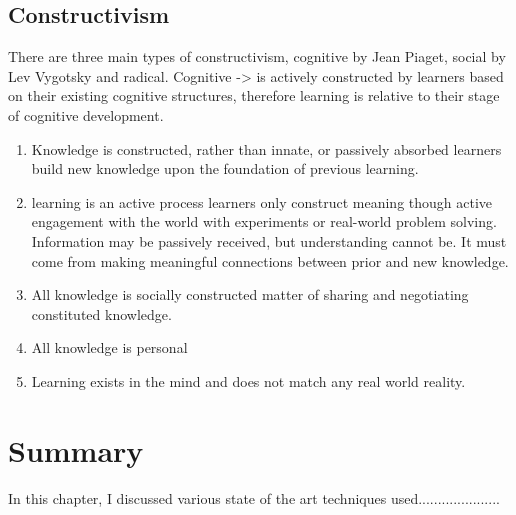\subsection{Constructivism}

There are three main types of constructivism, cognitive by Jean Piaget, social
by Lev Vygotsky and radical.
Cognitive -> is actively constructed by learners based on their existing cognitive
structures, therefore learning is relative to their stage of cognitive development.


\begin{enumerate}
\item Knowledge is constructed, rather than innate, or passively absorbed 
    learners build new knowledge upon the foundation of previous learning.
\item learning is an active process
    learners only construct meaning though active engagement with the world with
    experiments or real-world problem solving.
    Information may be passively received, but understanding cannot be.
    It must come from making meaningful connections between prior and new knowledge.
\item All knowledge is socially constructed
    matter of sharing and negotiating constituted knowledge.
\item All knowledge is personal
\item Learning exists in the mind and does not match any real world reality.

\end{enumerate}



\section{Summary}

In this chapter, I discussed various state of the art techniques used.....................
